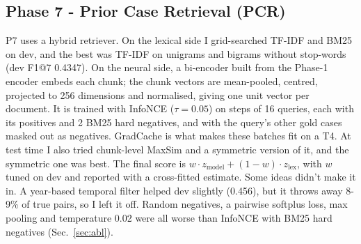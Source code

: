 \documentclass[11pt, oneside]{article}
\begin{document}
\subsection{Phase 7 - Prior Case Retrieval (PCR)}
P7 uses a hybrid retriever. On the lexical side I grid-searched TF-IDF and
BM25 on dev, and the best was TF-IDF on unigrams and bigrams without
stop-words (dev F1@7 0.4347). On the neural side, a bi-encoder built from the
Phase-1 encoder embeds each chunk; the chunk vectors are mean-pooled, centred,
projected to 256 dimensions and normalised, giving one unit vector per
document. It is trained with InfoNCE ($\tau = 0.05$) on steps of 16 queries,
each with its positives and 2 BM25 hard negatives, and with the query's other
gold cases masked out as negatives. GradCache is what makes these batches fit
on a T4. At test time I also tried chunk-level MaxSim and a symmetric version
of it, and the symmetric one was best. The final score is
$w \cdot z_{\text{model}} + (1-w) \cdot z_{\text{lex}}$, with $w$ tuned on dev
and reported with a cross-fitted estimate.
Some ideas didn't make it in. A year-based temporal filter helped dev slightly
(0.456), but it throws away 8-9\% of true pairs, so I left it off. Random
negatives, a pairwise softplus loss, max pooling and temperature 0.02 were all
worse than InfoNCE with BM25 hard negatives (Sec.~\ref{sec:abl}).
\end{document}
